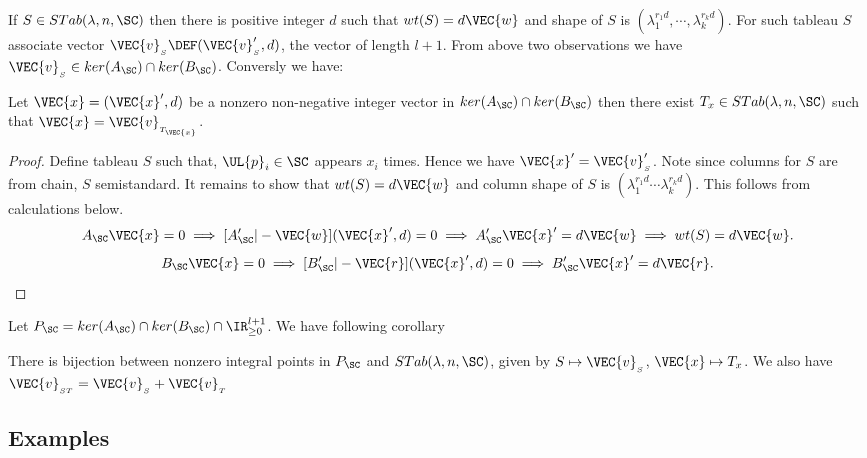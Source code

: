     If \(S \in STab(\lambda,n,\SC)\) then there is positive integer \(d\) 
    such that \(wt(S) = d\VEC{w}\) and shape of \(S\) is 
    \((\lambda_1^{r_1d},\cdots,\lambda_k^{r_kd})\).
    For such tableau \(S\) associate vector \(\VEC{v}_{_S} \DEF (\VEC{v}'_{_S},d)\), 
    the vector of length \(l+1\). 
    From above two observations we have \(\VEC{v}_{_S} \in ker(A_{\SC}) \cap ker(B_{\SC})\).
    Conversly we have: 
    \begin{observation}
        Let \(\VEC{x}=(\VEC{x}',d)\) be a nonzero non-negative integer vector 
        in \(ker(A_{\SC})\cap ker(B_{\SC})\)
        then there exist \(T_{x} \in STab(\lambda,n,\SC)\) 
        such that \(\VEC{x}=\VEC{v}_{_{T_{\VEC{x}}}}\).
    \end{observation}
    \begin{proof}
        Define tableau \(S\) such that, \(\UL{p}_i \in \SC\) appears \(x_i\) times.
        Hence we have \(\VEC{x}' = \VEC{v}'_{_S}\).
        Note since columns for \(S\) are from chain, \(S\) semistandard.
        It remains to show that \(wt(S) = d\VEC{w}\) and 
        column shape of \(S\) is \((\lambda_1^{r_1d} \cdots \lambda_k^{r_k d})\).
        This follows from calculations below.
        \[
            A_{\SC}\VEC{x} = 0
            \implies [A'_{\SC}|-\VEC{w}](\VEC{x}',d) = 0
            \implies A'_{\SC}\VEC{x}' = d\VEC{w}
            \implies wt(S) = d\VEC{w}.
        \]
        \[
            B_{\SC}\VEC{x} = 0
            \implies [B'_{\SC}|-\VEC{r}](\VEC{x}',d) = 0
            \implies B'_{\SC}\VEC{x}' = d \VEC{r}.
        \]
    \end{proof}

    Let \(P_{\SC} = ker(A_{\SC}) \cap ker(B_{\SC}) \cap \IR_{\ge 0}^{l+1}\). 
    We have following corollary
    \begin{corollary}
        There is bijection between nonzero integral points in \(P_{\SC}\) 
        and \(STab(\lambda,n,\SC)\), given by \(S \mapsto \VEC{v}_{_S}\), \(\VEC{x}\mapsto T_{x}\). 
        We also have \(\VEC{v}_{_{ST}} = \VEC{v}_{_S} + \VEC{v}_{_T}\)
    \end{corollary}
    
    \subsection{Examples}

